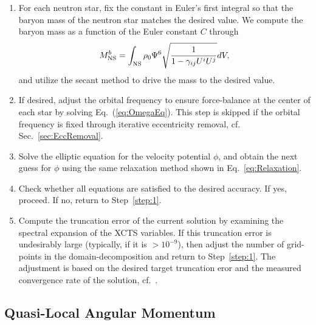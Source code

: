 {\begin{enumerate}
\item For each neutron star, fix the constant in Euler's first
  integral so that the baryon mass of the neutron star matches the desired
  value.  We compute the baryon mass as a function of the Euler constant $C$
through
\begin{equation}
M^b_{\rm NS} = \int_{\rm
  NS}\rho_0\Psi^6\sqrt{\frac{1}{1-\gamma_{ij}U^iU^j}}dV,
\end{equation}
and utilize the secant method
to drive the mass to the desired value.
\item If desired, adjust the orbital frequency to ensure force-balance at the
  center of each star by solving Eq.~(\ref{eq:OmegaEq}). This step is
  skipped if the orbital frequency is fixed through iterative eccentricity removal, cf. Sec.~\ref{sec:EccRemoval}.
\item Solve the elliptic equation for the velocity potential $\phi$,
  and obtain the next guess for $\phi$ using the same relaxation
  method shown in Eq.~\ref{eq:Relaxation}.
\item  Check whether all equations are satisfied to the desired accuracy. If yes, proceed. If no, return to Step~\ref{step:1}.
\item Compute the truncation error of the current solution by
    examining the spectral expansion of the XCTS variables. If this
    truncation error is undesirably large (typically, if it is
    $>10^{-9}$), then adjust the number of grid-points in the
    domain-decomposition and return to Step~\ref{step:1}. The adjustment
is based on the desired target truncation eror and the measured convergence rate of the solution, cf.~\cite{Szilagyi:2014fna}.
\end{enumerate}

\subsection{Quasi-Local Angular Momentum}
\label{sec:QLSpinExplanation}

}
